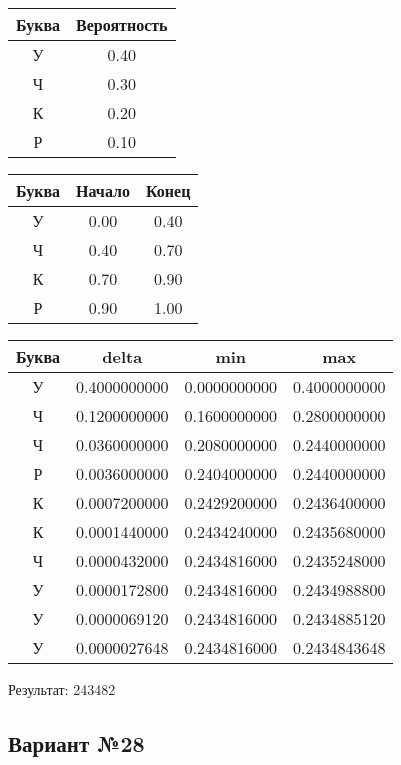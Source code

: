 \documentclass[a4paper, 12pt]{article}
\begin{document}
\begin{center}
 \begin{tabular}{ |c|c| } 
  \hline
     Буква & Вероятность \\ \hline
У & 0.40\\\hline
Ч & 0.30\\\hline
К & 0.20\\\hline
Р & 0.10
\\ \hline \end{tabular}
\end{center}
\begin{center}
 \begin{tabular}{ |c|c|c| } 
  \hline
     Буква & Начало & Конец \\ \hline
У & 0.00 & 0.40\\\hline
Ч & 0.40 & 0.70\\\hline
К & 0.70 & 0.90\\\hline
Р & 0.90 & 1.00
\\ \hline \end{tabular}
\end{center}
\begin{center}
 \begin{tabular}{ |c|c|c|c| } 
  \hline
     Буква & delta & min & max \\ \hline
У & 0.4000000000 & 0.0000000000 & 0.4000000000\\\hline
Ч & 0.1200000000 & 0.1600000000 & 0.2800000000\\\hline
Ч & 0.0360000000 & 0.2080000000 & 0.2440000000\\\hline
Р & 0.0036000000 & 0.2404000000 & 0.2440000000\\\hline
К & 0.0007200000 & 0.2429200000 & 0.2436400000\\\hline
К & 0.0001440000 & 0.2434240000 & 0.2435680000\\\hline
Ч & 0.0000432000 & 0.2434816000 & 0.2435248000\\\hline
У & 0.0000172800 & 0.2434816000 & 0.2434988800\\\hline
У & 0.0000069120 & 0.2434816000 & 0.2434885120\\\hline
У & 0.0000027648 & 0.2434816000 & 0.2434843648
\\ \hline \end{tabular}
\end{center}
Результат: 243482
\pagebreak
\subsection{Вариант №28}
\end{document}
